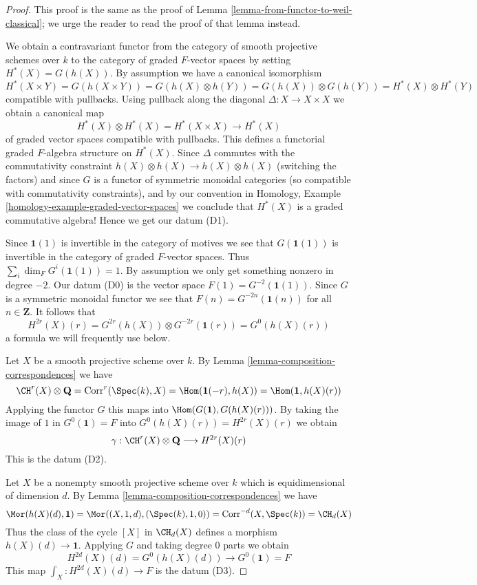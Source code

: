 \begin{proof}
This proof is the same as the proof of
Lemma \ref{lemma-from-functor-to-weil-classical};
we urge the reader to read the proof of that lemma instead.

\medskip\noindent
We obtain a contravariant functor from the category of smooth
projective schemes over $k$ to the category of graded $F$-vector spaces
by setting $H^*(X) = G(h(X))$. By assumption we have a canonical
isomorphism
$$
H^*(X \times Y) = G(h(X \times Y)) = G(h(X) \otimes h(Y)) =
G(h(X)) \otimes G(h(Y)) = H^*(X) \otimes H^*(Y)
$$
compatible with pullbacks. Using pullback along the diagonal
$\Delta : X \to X \times X$ we obtain a canonical map
$$
H^*(X) \otimes H^*(X) = H^*(X \times X) \to H^*(X)
$$
of graded vector spaces compatible with pullbacks.
This defines a functorial graded $F$-algebra structure on
$H^*(X)$. Since $\Delta$ commutes with the commutativity
constraint $h(X) \otimes h(X) \to h(X) \otimes h(X)$ (switching the factors)
and since $G$ is a functor of symmetric monoidal categories (so compatible with
commutativity constraints), and by our convention in
Homology, Example \ref{homology-example-graded-vector-spaces}
we conclude that $H^*(X)$ is a graded
commutative algebra! Hence we get our datum (D1).

\medskip\noindent
Since $\mathbf{1}(1)$ is invertible in the category of motives
we see that $G(\mathbf{1}(1))$ is invertible in the category of
graded $F$-vector spaces. Thus $\sum_i \dim_F G^i(\mathbf{1}(1)) = 1$.
By assumption we only get something nonzero in degree $-2$.
Our datum (D0) is the vector space $F(1) = G^{-2}(\mathbf{1}(1))$.
Since $G$ is a symmetric monoidal functor we see that
$F(n) = G^{-2n}(\mathbf{1}(n))$ for all $n \in \mathbf{Z}$.
It follows that
$$
H^{2r}(X)(r) = G^{2r}(h(X)) \otimes G^{-2r}(\mathbf{1}(r)) =
G^0(h(X)(r))
$$
a formula we will frequently use below.

\medskip\noindent
Let $X$ be a smooth projective scheme over $k$. By
Lemma \ref{lemma-composition-correspondences} we have
$$
\CH^r(X) \otimes \mathbf{Q} = \text{Corr}^r(\Spec(k), X) =
\Hom(\mathbf{1}(-r), h(X)) = \Hom(\mathbf{1}, h(X)(r))
$$
Applying the functor $G$ this maps into
$\Hom(G(\mathbf{1}), G(h(X)(r)))$.
By taking the image of $1$ in $G^0(\mathbf{1}) = F$
into $G^0(h(X)(r)) = H^{2r}(X)(r)$ we obtain
$$
\gamma :
\CH^r(X) \otimes \mathbf{Q} \longrightarrow H^{2r}(X)(r)
$$
This is the datum (D2).

\medskip\noindent
Let $X$ be a nonempty smooth projective scheme over $k$
which is equidimensional of dimension $d$. By
Lemma \ref{lemma-composition-correspondences} we have
$$
\Mor(h(X)(d), \mathbf{1}) = \Mor((X, 1, d), (\Spec(k), 1, 0)) =
\text{Corr}^{-d}(X, \Spec(k)) = \CH_d(X)
$$
Thus the class of the cycle $[X]$ in $\CH_d(X)$ defines a morphism
$h(X)(d) \to \mathbf{1}$. Applying $G$ and taking degree $0$
parts we obtain
$$
H^{2d}(X)(d) = G^0(h(X)(d)) \longrightarrow G^0(\mathbf{1}) = F
$$
This map $\int_X : H^{2d}(X)(d) \to F$ is the datum (D3).


\end{proof}
